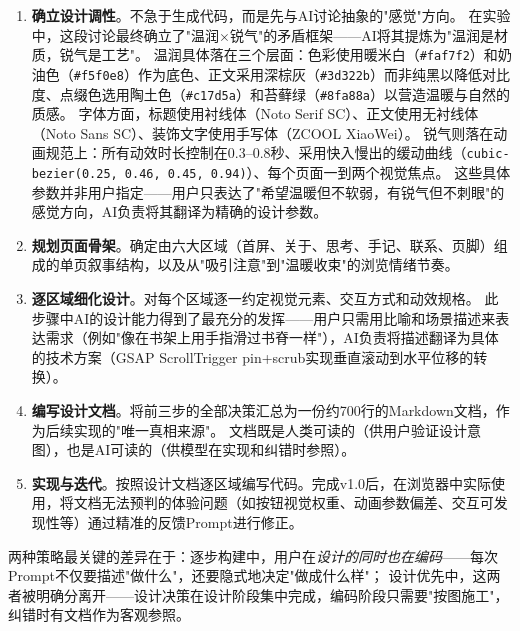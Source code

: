 \begin{enumerate}
    \item \textbf{确立设计调性}。不急于生成代码，而是先与AI讨论抽象的"感觉"方向。
    在实验中，这段讨论最终确立了"温润$\times$锐气"的矛盾框架——AI将其提炼为"温润是材质，锐气是工艺"。
    温润具体落在三个层面：色彩使用暖米白（\texttt{\#faf7f2}）和奶油色（\texttt{\#f5f0e8}）作为底色、正文采用深棕灰（\texttt{\#3d322b}）而非纯黑以降低对比度、点缀色选用陶土色（\texttt{\#c17d5a}）和苔藓绿（\texttt{\#8fa88a}）以营造温暖与自然的质感。
    字体方面，标题使用衬线体（Noto Serif SC）、正文使用无衬线体（Noto Sans SC）、装饰文字使用手写体（ZCOOL XiaoWei）。
    锐气则落在动画规范上：所有动效时长控制在0.3--0.8秒、采用快入慢出的缓动曲线（\texttt{cubic-bezier(0.25, 0.46, 0.45, 0.94)}）、每个页面一到两个视觉焦点。
    这些具体参数并非用户指定——用户只表达了"希望温暖但不软弱，有锐气但不刺眼"的感觉方向，AI负责将其翻译为精确的设计参数。

    \item \textbf{规划页面骨架}。确定由六大区域（首屏、关于、思考、手记、联系、页脚）组成的单页叙事结构，以及从"吸引注意"到"温暖收束"的浏览情绪节奏。

    \item \textbf{逐区域细化设计}。对每个区域逐一约定视觉元素、交互方式和动效规格。
    此步骤中AI的设计能力得到了最充分的发挥——用户只需用比喻和场景描述来表达需求（例如"像在书架上用手指滑过书脊一样"），AI负责将描述翻译为具体的技术方案（GSAP ScrollTrigger pin+scrub实现垂直滚动到水平位移的转换）。

    \item \textbf{编写设计文档}。将前三步的全部决策汇总为一份约700行的Markdown文档，作为后续实现的"唯一真相来源"。
    文档既是人类可读的（供用户验证设计意图），也是AI可读的（供模型在实现和纠错时参照）。

    \item \textbf{实现与迭代}。按照设计文档逐区域编写代码。完成v1.0后，在浏览器中实际使用，将文档无法预判的体验问题（如按钮视觉权重、动画参数偏差、交互可发现性等）通过精准的反馈Prompt进行修正。
\end{enumerate}

两种策略最关键的差异在于：逐步构建中，用户在\textit{设计的同时也在编码}——每次Prompt不仅要描述"做什么"，还要隐式地决定"做成什么样"；
设计优先中，这两者被明确分离开——设计决策在设计阶段集中完成，编码阶段只需要"按图施工"，纠错时有文档作为客观参照。
